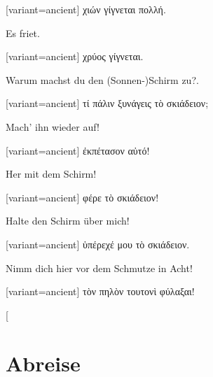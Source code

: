 \begin{greek}[variant=ancient]%
χιών γίγνεται πολλή.

\end{greek}%
\switchcolumn*

Es friet.

\switchcolumn

\begin{greek}[variant=ancient]%
χρύος γίγνεται.

\end{greek}%
\switchcolumn*

Warum machst du den (Sonnen-)Schirm zu?.

\switchcolumn

\begin{greek}[variant=ancient]%
τί πάλιν ξυνάγεις τὸ σκιάδειον;

\end{greek}%
\switchcolumn*

Mach' ihn wieder auf!

\switchcolumn

\begin{greek}[variant=ancient]%
ἐκπέτασον αὐτό!

\end{greek}%
\switchcolumn*

Her mit dem Schirm!

\switchcolumn

\begin{greek}[variant=ancient]%
φέρε τὸ σκιάδειον!

\end{greek}%
\switchcolumn*

Halte den Schirm über mich!

\switchcolumn

\begin{greek}[variant=ancient]%
ὑπέρεχέ μου τὸ σκιάδειον.

\end{greek}%
\switchcolumn*

Nimm dich hier vor dem Schmutze in Acht!

\switchcolumn

\begin{greek}[variant=ancient]%
τὸν πηλὸν τουτονὶ φύλαξαι!

\end{greek}%
\switchcolumn*[


\section{Abreise}


